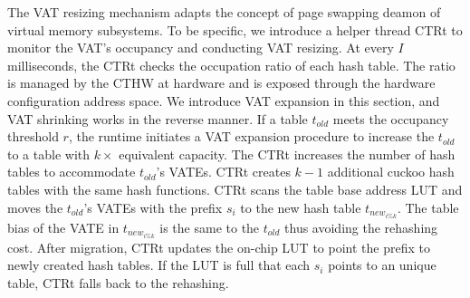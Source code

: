 The VAT resizing mechanism adapts the concept of page swapping deamon of virtual memory subsystems. To be specific, we introduce a helper thread CTRt to monitor the VAT's occupancy and conducting VAT resizing. At every $I$ milliseconds, the CTRt checks the occupation ratio of each hash table. The ratio is managed by the CTHW at hardware and is exposed through the hardware configuration address space. We introduce VAT expansion in this section, and VAT shrinking works in the reverse manner. If a table $t_{old}$ meets the occupancy threshold $r$, the runtime initiates a VAT expansion procedure to increase the $t_{old}$ to a table with $k\times$ equivalent capacity. The CTRt increases the number of hash tables to accommodate $t_{old}$'s VATEs. CTRt creates $k-1$ additional cuckoo hash tables with the same hash functions. CTRt scans the table base address LUT and moves the $t_{old}$'s VATEs with the prefix $s_i$ to the new hash table $t_{new_{i\%k}}$. The table bias of the VATE in $t_{new_{i\%k}}$ is the same to the $t_{old}$ thus avoiding the rehashing cost. After migration, CTRt updates the on-chip LUT to point the prefix to newly created hash tables. If the LUT is full that each $s_i$ points to an unique table, CTRt falls back to the rehashing. 



